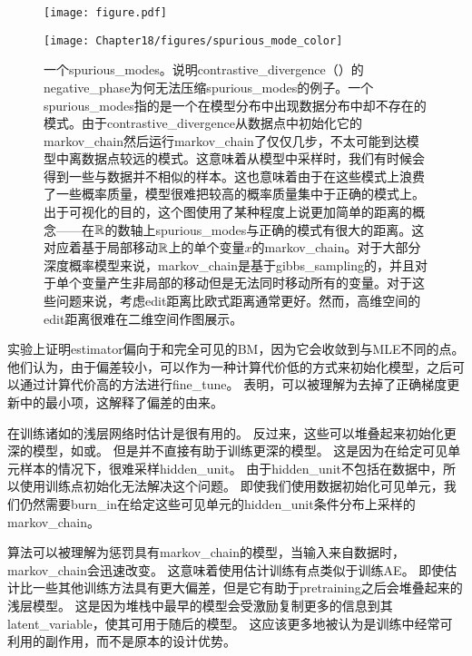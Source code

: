 \begin{figure}[!htb]
\ifOpenSource
\centerline{\texttt{[image: figure.pdf]}}
\else
\centerline{\texttt{[image: Chapter18/figures/spurious\_mode\_color]}}
\fi
\caption{一个\gls{spurious_modes}。说明\gls{contrastive_divergence}（）的\gls{negative_phase}为何无法压缩\gls{spurious_modes}的例子。一个\gls{spurious_modes}指的是一个在模型分布中出现数据分布中却不存在的模式。由于\gls{contrastive_divergence}从数据点中初始化它的\gls{markov_chain}然后运行\gls{markov_chain}了仅仅几步，不太可能到达模型中离数据点较远的模式。这意味着从模型中采样时，我们有时候会得到一些与数据并不相似的样本。这也意味着由于在这些模式上浪费了一些概率质量，模型很难把较高的概率质量集中于正确的模式上。出于可视化的目的，这个图使用了某种程度上说更加简单的距离的概念——在$\mathbb{R}$的数轴上\gls{spurious_modes}与正确的模式有很大的距离。这对应着基于局部移动$\mathbb{R}$上的单个变量$x$的\gls{markov_chain}。对于大部分深度概率模型来说，\gls{markov_chain}是基于\gls{gibbs_sampling}的，并且对于单个变量产生非局部的移动但是无法同时移动所有的变量。对于这些问题来说，考虑edit距离比欧式距离通常更好。然而，高维空间的edit距离很难在二维空间作图展示。}
\label{fig:chap18_spurious_mode}
\end{figure}


\cite{Perpinan+Hinton-2005-small}实验上证明\gls{estimator}偏向于和完全可见的\gls{BM}，因为它会收敛到与\gls{MLE}不同的点。
他们认为，由于偏差较小，可以作为一种计算代价低的方式来初始化模型，之后可以通过计算代价高的方法进行\gls{fine_tune}。
\cite{Bengio+Delalleau-2009}表明，可以被理解为去掉了正确梯度更新中的最小项，这解释了偏差的由来。


在训练诸如的浅层网络时估计是很有用的。
反过来，这些可以堆叠起来初始化更深的模型，如或。
但是并不直接有助于训练更深的模型。
这是因为在给定可见单元样本的情况下，很难采样\gls{hidden_unit}。
由于\gls{hidden_unit}不包括在数据中，所以使用训练点初始化无法解决这个问题。
即使我们使用数据初始化可见单元，我们仍然需要\gls{burn_in}在给定这些可见单元的\gls{hidden_unit}条件分布上采样的\gls{markov_chain}。


算法可以被理解为惩罚具有\gls{markov_chain}的模型，当输入来自数据时，\gls{markov_chain}会迅速改变。
这意味着使用估计训练有点类似于训练\gls{AE}。
即使估计比一些其他训练方法具有更大偏差，但是它有助于\gls{pretraining}之后会堆叠起来的浅层模型。
这是因为堆栈中最早的模型会受激励复制更多的信息到其\gls{latent_variable}，使其可用于随后的模型。
这应该更多地被认为是训练中经常可利用的副作用，而不是原本的设计优势。


